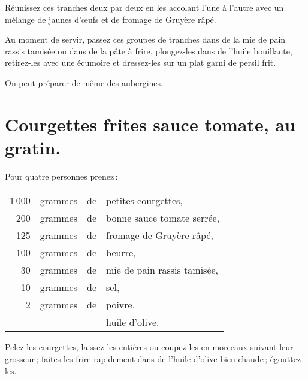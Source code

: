 Réunissez ces tranches deux par deux en les accolant l'une à l'autre avec un
mélange de jaunes d'œufs et de fromage de Gruyère râpé.

Au moment de servir, passez ces groupes de tranches dans de la mie de pain
rassis tamisée ou dans de la pâte à frire, plongez-les dans de l'huile bouillante,
retirez-les avec une écumoire et dressez-les sur un plat garni de persil frit.

\sk

On peut préparer de même des aubergines.

\section*{\centering Courgettes frites sauce tomate, au gratin.}
{}

Pour quatre personnes prenez :

\footnotesize
\begin{longtable}{rrrp{16em}}
  1 000 & grammes & de & petites courgettes,                                                              \\
    200 & grammes & de & bonne sauce tomate serrée,                                                       \\
    125 & grammes & de & fromage de Gruyère râpé,                                                         \\
    100 & grammes & de & beurre,                                                                          \\
     30 & grammes & de & mie de pain rassis tamisée,                                                      \\
     10 & grammes & de & sel,                                                                             \\
      2 & grammes & de & poivre,                                                                          \\
        &         &    & huile d'olive.                                                                   \\
\end{longtable}
\normalsize

Pelez les courgettes, laissez-les entières ou coupez-les en morceaux suivant
leur grosseur ; faites-les frire rapidement dans de l'huile d'olive bien
chaude ; égouttez-les.

